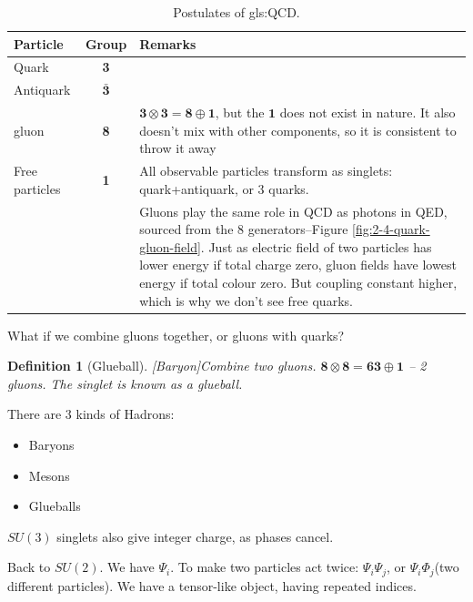 \documentclass[]{article}
\newtheorem{defn}[thm]{Definition}
\begin{document}
\begin{table}[H]
	\begin{center}
		\caption{Postulates of \gls{gls:QCD}.}\label{table:postulates:QCD}
		\begin{tabular}{|l|c|p{8cm}|} \hline
			Particle&Group&Remarks \\ \hline
			Quark&{\bfseries 3}& \\ \hline
			Antiquark&$\bm{\bar{3}}$& \\ \hline
			gluon&{\bfseries 8}&$\bm{3}\otimes\bm{3}=\bm{8}\oplus\bm{1}$, but the $\bm{1}$ does not exist in nature. It also doesn't mix with other components, so it is consistent to throw it away \\ \hline
			Free particles&{\bfseries 1}&All observable particles transform as singlets: quark+antiquark, or 3 quarks.\\ \hline
			&&Gluons play the same role in QCD as photons in QED, sourced from the 8 generators--Figure \ref{fig:2-4-quark-gluon-field}. Just as electric field of two particles has lower energy if total charge zero, gluon fields have lowest energy if total colour zero. But coupling constant higher, which is why we don't see free quarks.\\ \hline
		\end{tabular}
	\end{center}
\end{table}

What if we combine gluons together, or gluons with quarks?

\begin{defn}[Glueball][Baryon]\label{defn:glueball}
	Combine two gluons. $\bm{8} \otimes \bm{8} = \bm{63} \oplus \bm{1}$ -- 2 gluons. The singlet is known as a glueball.
\end{defn}

There are 3 kinds of Hadrons:
\begin{itemize}
	\item Baryons
	\item Mesons
	\item Glueballs
\end{itemize}

$SU(3)$ singlets also give integer charge, as phases cancel.

Back to $SU(2)$. We have $\Psi_i$. To make two particles act twice: $\Psi_i\Psi_j$, or $\Psi_i\Phi_j$(two different particles). We have a tensor-like object, having repeated indices.
\end{document}
